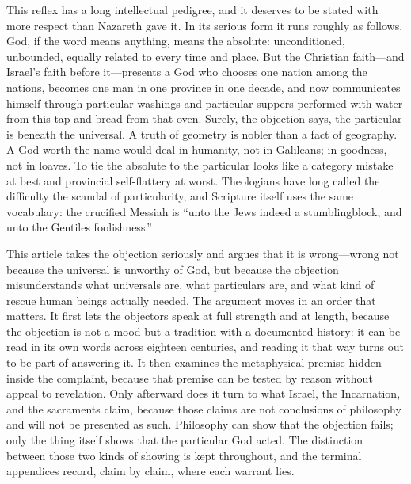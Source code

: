 This reflex has a long intellectual pedigree, and it deserves to be stated with more respect than Nazareth gave it. In its serious form it runs roughly as follows. God, if the word means anything, means the absolute: unconditioned, unbounded, equally related to every time and place. But the Christian faith---and Israel's faith before it---presents a God who chooses one nation among the nations, becomes one man in one province in one decade, and now communicates himself through particular washings and particular suppers performed with water from this tap and bread from that oven. Surely, the objection says, the particular is beneath the universal. A truth of geometry is nobler than a fact of geography. A God worth the name would deal in humanity, not in Galileans; in goodness, not in loaves. To tie the absolute to the particular looks like a category mistake at best and provincial self-flattery at worst. Theologians have long called the difficulty the scandal of particularity, and Scripture itself uses the same vocabulary: the crucified Messiah is ``unto the Jews indeed a stumblingblock, and unto the Gentiles foolishness.''\,

This article takes the objection seriously and argues that it is wrong---wrong not because the universal is unworthy of God, but because the objection misunderstands what universals are, what particulars are, and what kind of rescue human beings actually needed. The argument moves in an order that matters. It first lets the objectors speak at full strength and at length, because the objection is not a mood but a tradition with a documented history: it can be read in its own words across eighteen centuries, and reading it that way turns out to be part of answering it. It then examines the metaphysical premise hidden inside the complaint, because that premise can be tested by reason without appeal to revelation. Only afterward does it turn to what Israel, the Incarnation, and the sacraments claim, because those claims are not conclusions of philosophy and will not be presented as such. Philosophy can show that the objection fails; only the thing itself shows that the particular God acted. The distinction between those two kinds of showing is kept throughout, and the terminal appendices record, claim by claim, where each warrant lies.
